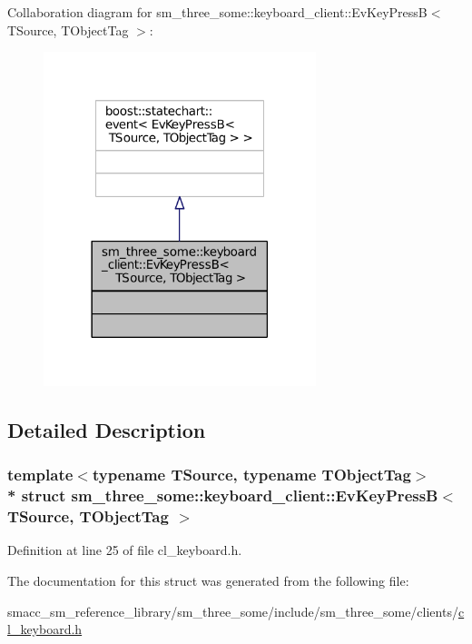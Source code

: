 Collaboration diagram for sm\+\_\+three\+\_\+some\+:\+:keyboard\+\_\+client\+:\+:Ev\+Key\+PressB$<$ T\+Source, T\+Object\+Tag $>$\+:
\nopagebreak
\begin{figure}[H]
\begin{center}
\leavevmode
\includegraphics[width=225pt]{structsm__three__some_1_1keyboard__client_1_1EvKeyPressB__coll__graph}
\end{center}
\end{figure}


\subsection{Detailed Description}
\subsubsection*{template$<$typename T\+Source, typename T\+Object\+Tag$>$\\*
struct sm\+\_\+three\+\_\+some\+::keyboard\+\_\+client\+::\+Ev\+Key\+Press\+B$<$ T\+Source, T\+Object\+Tag $>$}



Definition at line 25 of file cl\+\_\+keyboard.\+h.



The documentation for this struct was generated from the following file\+:\begin{DoxyCompactItemize}
\item 
smacc\+\_\+sm\+\_\+reference\+\_\+library/sm\+\_\+three\+\_\+some/include/sm\+\_\+three\+\_\+some/clients/\hyperlink{cl__keyboard_8h}{cl\+\_\+keyboard.\+h}\end{DoxyCompactItemize}
